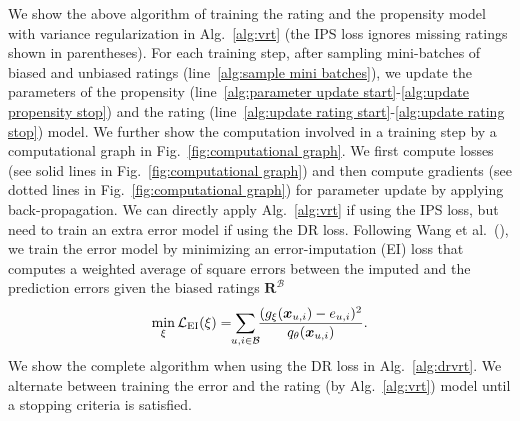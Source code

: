 \documentclass[letterpaper]{article} %
\newcommand{\matrixize}[1]{\mathbf{#1}}
\newcommand{\vectorize}[1]{\bm{#1}}
\newcommand{\lrdense}[2]{\smashoperator[lr]{#1_{#2}}}
\newcommand{\obsBiasedPairs}{\mathcal{B}}
\newcommand{\trueRatings}{\matrixize{R}}
\newcommand{\featureMark}{x}
\newcommand{\biasedFeatures}{\vectorize{\featureMark}_{u,i}}
\newcommand{\loss}[1]{\mathcal{L}_{\rm #1}}
\newcommand{\errorName}{g}
\newcommand{\errorParam}{\xi}%
\newcommand{\errorModel}{\errorName_\errorParam(\biasedFeatures)}
\newcommand{\trueError}{e_{u,i}}
\newcommand{\propensityName}{q}
\newcommand{\propensityParam}{\theta}
\newcommand{\propensityModel}{\propensityName_\propensityParam(\biasedFeatures)}
\newcommand{\step}{s}
\begin{document}
We show the above algorithm of training the rating and the propensity model with variance regularization in Alg.~\ref{alg:vrt} (the IPS loss ignores missing ratings shown in parentheses).
For each training step, after sampling mini-batches of biased and unbiased ratings (line~\ref{alg:sample mini batches}), we update the parameters of the propensity (line~\ref{alg:parameter update start}-\ref{alg:update propensity stop}) and the rating (line~\ref{alg:update rating start}-\ref{alg:update rating stop}) model.
We further show the computation involved in a training step by a computational graph in Fig.~\ref{fig:computational graph}.
We first compute losses (see solid lines in Fig.~\ref{fig:computational graph}) and then compute gradients (see dotted lines in Fig.~\ref{fig:computational graph}) for parameter update by applying back-propagation.
We can directly apply Alg.~\ref{alg:vrt} if using the IPS loss, but need to train an extra error model if using the DR loss.
Following Wang et al.~(\citeyear{wang2019doubly}), we train the error model by minimizing an error-imputation (EI) loss that computes a weighted average of square errors between the imputed and the prediction errors given the biased ratings $\trueRatings^\obsBiasedPairs$
\begin{equation*}
\min_{\errorParam}\loss{EI}(\errorParam)
=\lrdense{\sum}{u,i\in\obsBiasedPairs}
\frac{(\errorModel-\trueError)^2}{\propensityModel}.
\end{equation*}%
We show the complete algorithm when using the DR loss in Alg.~\ref{alg:drvrt}.
We alternate between training the error and the rating (by Alg.~\ref{alg:vrt}) model until a stopping criteria is satisfied.
\end{document}
